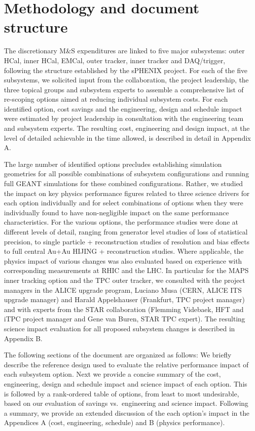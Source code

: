 \section{Methodology and document structure}

The discretionary M\&S expenditures are linked to five major subsystems: outer HCal, inner HCal, EMCal, outer tracker, inner tracker and DAQ/trigger, 
following the structure established by the sPHENIX project. For each of the five subsystems, we solicited input from the collaboration, the 
project leadership, the three topical groups and subsystem experts to assemble a comprehensive list of re-scoping options aimed at reducing 
individual subsystem costs. For each identified option, cost savings and the engineering, design and schedule impact were estimated by project 
leadership in consultation with the engineering team and subsystem experts. The resulting cost, engineering and design impact, at the 
level of detailed achievable in the time allowed, is described in detail in Appendix A.

The large number of identified options precludes establishing simulation geometries for all possible combinations of subsystem configurations
and running full GEANT simulations for these combined configurations. Rather, we studied the impact on key physics performance figures
related to three science drivers for each option individually and for select combinations of options when they were individually found to
have non-negligible impact on the same performance characteristics. For the various options, the performance studies were done at different 
levels of detail, ranging from generator level studies of loss of statistical precision, to single particle \geant + reconstruction studies 
of resolution and bias effects to full central Au+Au HIJING \geant + reconstruction studies. Where applicable, the physics impact of various
changes was also evaluated based on experience with corresponding
measurements at RHIC and the LHC. In particular for the MAPS inner tracking 
option and the TPC outer tracker, we consulted with the project managers in the ALICE upgrade program, Luciano Musa (CERN, ALICE ITS upgrade 
manager) and Harald Appelshauser (Frankfurt, TPC project manager) and with experts from the STAR collaboration (Flemming Videbaek, HFT and
iTPC project manager and Gene van Buren, STAR TPC expert). The resulting science impact evaluation for all proposed subsystem changes 
is described in Appendix B.

The following sections of the document are organized as follows: We briefly describe the reference design used to evaluate the relative
performance impact of each subsystem option. Next we provide a concise summary of the cost, engineering, design and schedule impact and 
science impact of each option. This is followed by a rank-ordered table of options, from least to most undesirable, based on our 
evaluation of savings vs.\ engineering and science impact. Following a summary, we provide an extended discussion of the each option's impact
in the Appendices A (cost, engineering, schedule) and B (physics performance).


